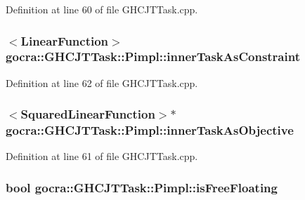 Definition at line 60 of file G\+H\+C\+J\+T\+Task.\+cpp.

\subsubsection[{\texorpdfstring{inner\+Task\+As\+Constraint}{innerTaskAsConstraint}}]{$<${\bf Linear\+Function}$>$ gocra\+::\+G\+H\+C\+J\+T\+Task\+::\+Pimpl\+::inner\+Task\+As\+Constraint}\hypertarget{structgocra_1_1GHCJTTask_1_1Pimpl_aca6261d2f483c550e6e71c4d31b7c0c1}{}\label{structgocra_1_1GHCJTTask_1_1Pimpl_aca6261d2f483c550e6e71c4d31b7c0c1}


Definition at line 62 of file G\+H\+C\+J\+T\+Task.\+cpp.

\subsubsection[{\texorpdfstring{inner\+Task\+As\+Objective}{innerTaskAsObjective}}]{$<${\bf Squared\+Linear\+Function}$>$$\ast$ gocra\+::\+G\+H\+C\+J\+T\+Task\+::\+Pimpl\+::inner\+Task\+As\+Objective}\hypertarget{structgocra_1_1GHCJTTask_1_1Pimpl_a43d0c542d4107893610d8d07cce2fdd0}{}\label{structgocra_1_1GHCJTTask_1_1Pimpl_a43d0c542d4107893610d8d07cce2fdd0}


Definition at line 61 of file G\+H\+C\+J\+T\+Task.\+cpp.

\subsubsection[{\texorpdfstring{is\+Free\+Floating}{isFreeFloating}}]{\setlength{\rightskip}{0pt plus 5cm}bool gocra\+::\+G\+H\+C\+J\+T\+Task\+::\+Pimpl\+::is\+Free\+Floating}\hypertarget{structgocra_1_1GHCJTTask_1_1Pimpl_a3fefbc36e9c5e9b8c4fc8f85fb19da53}{}\label{structgocra_1_1GHCJTTask_1_1Pimpl_a3fefbc36e9c5e9b8c4fc8f85fb19da53}


